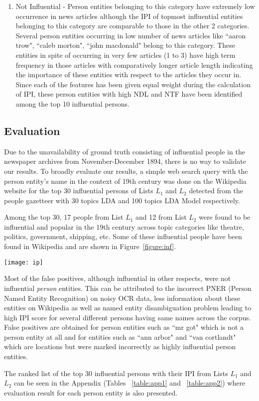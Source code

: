 \begin{enumerate}
\item
Not Influential - Person entities belonging to this category have extremely low occurrence in news articles although the IPI of topmost influential entities belonging to this category are comparable to those in the other 2 categories.
Several person entities occurring in low number of news articles like ``aaron trow", ``caleb morton", ``john macdonald"  belong to this category. These entities in spite of occurring in very few articles (1 to 3) have high term frequency in those articles with comparatively longer article length indicating the importance of these entities with respect to the articles they occur in. Since each of the features has been given equal weight during the calculation of IPI,  these person entities with high NDL and NTF have been identified among the top 10 influential persons. 
 

\end{enumerate} 


\subsection{Evaluation}

Due to the unavailability of ground truth consisting of influential people in the newspaper archives from November-December 1894, there is no way to validate our results. 
To broadly evaluate our results, a simple web search query with the person entity's name in the context of 19th century was done on the Wikipedia website for the top 30 influential persons of Lists $L_1$ and $L_2$ detected from the people gazetteer with 30 topics LDA and 100 topics LDA Model respectively.

Among the top 30, 17 people from List $L_1$ and 12 from List $L_2$ were found to be influential and popular in the 19th century across topic categories like theatre, politics, government, shipping, etc. Some of these influential people have been found in Wikipedia and are shown in Figure~\ref{figure:inf}. 

\begin{figure*}
\begin{center}
\texttt{[image: ip]}
\caption{Some of the top 30 influential persons obtained from the dataset and also found on Wikipedia during evaluation}
\label{figure:inf}
\end{center}
\end{figure*}


 Most of the false positives, although influential in other respects, were not  influential \emph{person} entities. This can be attributed to the incorrect PNER (Person Named Entity Recognition) on noisy OCR data, less information about these entities on Wikipedia as well as named entity disambiguation problem leading to high IPI score for several different persons having same names across the corpus.
 False positives are obtained for person entities  such as ``mr got" which is not a person entity at all and for entities such as ``ann arbor" and ``van cortlandt" which are  locations but were marked incorrectly as highly influential person entities.
 
 The ranked list of the top 30 influential persons with their IPI from Lists $L_1$ and $L_2$ can be seen in the Appendix (Tables ~\ref{table:app1} and ~\ref{table:app2}) where evaluation result for each person entity is also presented.
